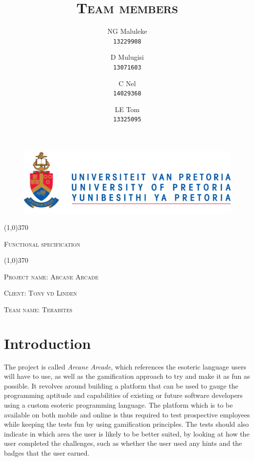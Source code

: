 \documentclass[english]{article}
\title{\scshape\Large Team members}
\author{
	NG Maluleke\\
	\texttt{13229908}
	\and
	D Mulugisi\\
	\texttt{13071603}
	\and
	C Nel\\
	\texttt{14029368}
	\and
	LE Tom\\
	\texttt{13325095}
}
\begin{document}
	
	\begin{figure}
		\includegraphics[width=\linewidth]{up_logo.png}
	\end{figure}
	
	\begin{center}
	 \line(1,0){370}
	\\[0.2cm]
    {\scshape\Large Functional specification \par}
	\vspace{0.1cm}
	\line(1,0){370}
	\\[0.8cm]
	
	{\scshape\large Project name: Arcane Arcade\par}	
	\vspace{1cm}
	{\scshape\large Client: Tony vd Linden\par}
	\vspace{1cm}
	{\scshape\large Team name: Terabites\par}
	\vspace{1cm}
	{\let\newpage\relax\maketitle}
	\end{center}
	
	
	\newpage
	\tableofcontents

	\newpage
	
	\section{Introduction}
		 The project is called \textit{Arcane Arcade}, which references the esoteric language users will have to use, as well as the gamification approach to try and make it as fun as possible. It revolves around building a platform that can be used to gauge the programming aptitude and capabilities of existing or future software developers using a custom esoteric programming language. The platform which is to be available on both mobile and online is thus required to test prospective employees while keeping the tests fun by using gamification principles. The tests should also indicate in which area the user is likely to be better suited, by looking at how the user completed the challenges, such as whether the user used any hints and the badges that the user earned.
\end{document}
